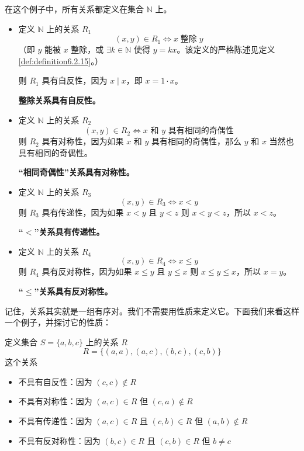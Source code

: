 \begin{example}
    在这个例子中，所有关系都定义在集合 $\mathbb{N}$ 上。
    \begin{itemize}
        \item 定义 $\mathbb{N}$ 上的关系 $R_1$
        \[(x, y) \in R_1 \iff x \;\text{整除}\; y\]
        （即 $y$ 能被 $x$ 整除，或 $\exists k \in \mathbb{N}$ 使得 $y=kx$。该定义的严格陈述见定义\ref{def:definition6.2.15}。）

        则 $R_1$ 具有自反性，因为 $x \mid x$，即 $x=1 \cdot x$。

        \textbf{整除关系具有自反性。}
        \item 定义 $\mathbb{N}$ 上的关系 $R_2$
        \[(x, y) \in R_2 \iff x \text{ 和 } y \text{ 具有相同的奇偶性}\]
        则 $R_2$ 具有对称性，因为如果 $x$ 和 $y$ 具有相同的奇偶性，那么 $y$ 和 $x$ 当然也具有相同的奇偶性。

        \textbf{``相同奇偶性''关系具有对称性。}
        \item 定义 $\mathbb{N}$ 上的关系 $R_3$
        \[(x, y) \in R_3 \iff x < y\]
        则 $R_3$ 具有传递性，因为如果 $x<y$ 且 $y<z$ 则 $x<y<z$，所以 $x<z$。

        \textbf{``$<$''关系具有传递性。}
        \item 定义 $\mathbb{N}$ 上的关系 $R_4$
        \[(x, y) \in R_4 \iff x \le y\]
        则 $R_4$ 具有反对称性，因为如果 $x \le y$ 且 $y \le x$ 则 $x \le y \le x$，所以 $x=y$。

        \textbf{``$\le$''关系具有反对称性。}
    \end{itemize}
\end{example}

\begin{example}
    记住，关系其实就是一组有序对。我们不需要用性质来定义它。下面我们来看这样一个例子，并探讨它的性质：

    定义集合 $S=\{a,b,c\}$ 上的关系 $R$
    \[R = \{(a, a),(a, c),(b, c),(c, b)\}\]
    这个关系
    \begin{itemize}
        \item 不具有自反性：因为 $(c,c) \notin R$
        \item 不具有对称性：因为 $(a, c) \in R$ 但 $(c, a) \notin R$
        \item 不具有传递性：因为 $(a, c) \in R$ 且 $(c, b) \in R$ 但 $(a, b) \notin R$
        \item 不具有反对称性：因为 $(b, c) \in R$ 且 $(c, b) \in R$ 但 $b \ne c$
    \end{itemize}
\end{example}

